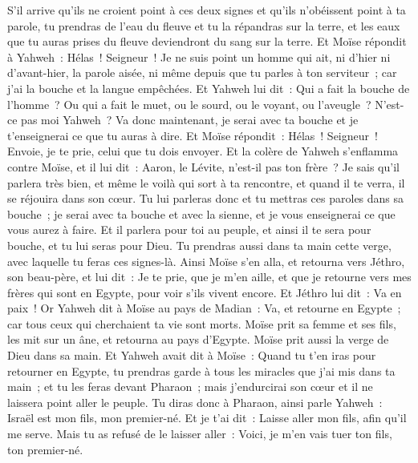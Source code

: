 \begin{multicols}{2}
S'il arrive qu'ils ne croient point à ces deux signes et qu'ils n'obéissent point à ta parole, tu prendras de l'eau du fleuve et tu la répandras sur la terre, et les eaux que tu auras prises du fleuve deviendront du sang sur la terre.
Et Moïse répondit à Yahweh~: Hélas~! Seigneur~! Je ne suis point un homme qui ait, ni d'hier ni d'avant-hier, la parole aisée, ni même depuis que tu parles à ton serviteur~; car j'ai la bouche et la langue empêchées.
Et Yahweh lui dit~: Qui a fait la bouche de l'homme~? Ou qui a fait le muet, ou le sourd, ou le voyant, ou l'aveugle~? N'est-ce pas moi Yahweh~?
Va donc maintenant, je serai avec ta bouche et je t'enseignerai ce que tu auras à dire.
Et Moïse répondit~: Hélas~! Seigneur~! Envoie, je te prie, celui que tu dois envoyer.
Et la colère de Yahweh s'enflamma contre Moïse, et il lui dit~: Aaron, le Lévite, n'est-il pas ton frère~? Je sais qu'il parlera très bien, et même le voilà qui sort à ta rencontre, et quand il te verra, il se réjouira dans son cœur.
Tu lui parleras donc et tu mettras ces paroles dans sa bouche~; je serai avec ta bouche et avec la sienne, et je vous enseignerai ce que vous aurez à faire.
Et il parlera pour toi au peuple, et ainsi il te sera pour bouche, et tu lui seras pour Dieu.
Tu prendras aussi dans ta main cette verge, avec laquelle tu feras ces signes-là.
Ainsi Moïse s'en alla, et retourna vers Jéthro, son beau-père, et lui dit~: Je te prie, que je m'en aille, et que je retourne vers mes frères qui sont en Egypte, pour voir s'ils vivent encore. Et Jéthro lui dit~: Va en paix~!
Or Yahweh dit à Moïse au pays de Madian~: Va, et retourne en Egypte~; car tous ceux qui cherchaient ta vie sont morts.
Moïse prit sa femme et ses fils, les mit sur un âne, et retourna au pays d'Egypte. Moïse prit aussi la verge de Dieu dans sa main.
Et Yahweh avait dit à Moïse~: Quand tu t'en iras pour retourner en Egypte, tu prendras garde à tous les miracles que j'ai mis dans ta main~; et tu les feras devant Pharaon~; mais j'endurcirai son cœur et il ne laissera point aller le peuple.
Tu diras donc à Pharaon, ainsi parle Yahweh~: Israël est mon fils, mon premier-né.
Et je t'ai dit~: Laisse aller mon fils, afin qu'il me serve. Mais tu as refusé de le laisser aller~: Voici, je m'en vais tuer ton fils, ton premier-né.

\end{multicols}
